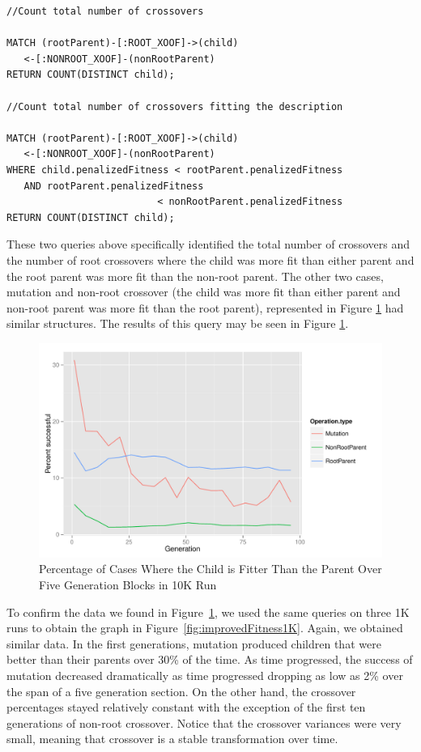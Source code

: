 \documentclass[12pt]{article}
\begin{document}
\begin{verbatim}
//Count total number of crossovers

MATCH (rootParent)-[:ROOT_XOOF]->(child)
   <-[:NONROOT_XOOF]-(nonRootParent)
RETURN COUNT(DISTINCT child);

//Count total number of crossovers fitting the description

MATCH (rootParent)-[:ROOT_XOOF]->(child)
   <-[:NONROOT_XOOF]-(nonRootParent)
WHERE child.penalizedFitness < rootParent.penalizedFitness 
   AND rootParent.penalizedFitness 
                          < nonRootParent.penalizedFitness
RETURN COUNT(DISTINCT child);

\end{verbatim}

These two queries above specifically identified the total number of crossovers and the number of root crossovers where the child was more fit than either parent and the root parent was more fit than the non-root parent. The other two cases, mutation and non-root crossover (the child was more fit than either parent and non-root parent was more fit than the root parent), represented in Figure \ref{fig:improvedFitness} had similar structures. The results of this query may be seen in Figure \ref{fig:improvedFitness}.

\begin{figure}[p]
 \centering
 \includegraphics[height=0.63\textwidth]{Blocked_success_percentages}
 \caption{Percentage of Cases Where the Child is Fitter Than the Parent Over Five Generation Blocks in 10K Run}
 \label{fig:improvedFitness}
\end{figure}

To confirm the data we found in Figure~\ref{fig:improvedFitness}, we used the same queries on three 1K runs to obtain the graph in Figure~\ref{fig:improvedFitness1K}. Again, we obtained similar data. In the first generations, mutation produced children that were better than their parents over 30\% of the time. As time progressed, the success of mutation decreased dramatically as time progressed dropping as low as 2\% over the span of a five generation section. On the other hand, the crossover percentages stayed relatively constant with the exception of the first ten generations of non-root crossover. Notice that the crossover variances were very small, meaning that crossover is a stable transformation over time. 
\end{document}
